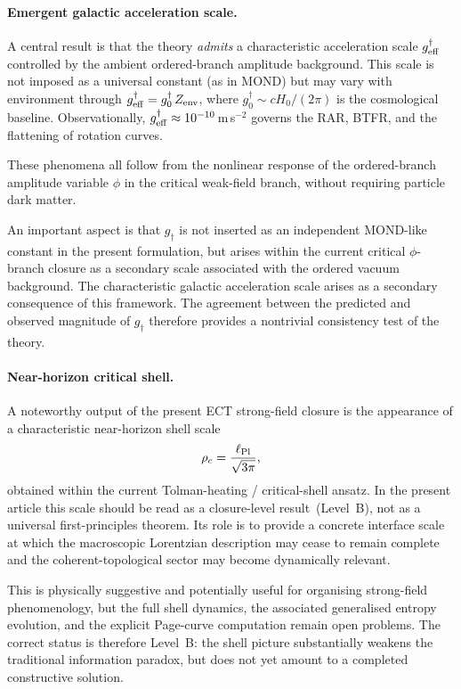 \documentclass[11pt,a4paper]{article}
\numberwithin{equation}{section}
\begin{document}
\paragraph{Emergent galactic acceleration scale.}

A central result is that the theory \emph{admits} a
characteristic acceleration scale $g^\dagger_{\rm eff}$
controlled by the ambient ordered-branch amplitude background.
This scale is not imposed as a universal constant
(as in MOND) but may vary with environment through
$g^\dagger_{\rm eff} = g^\dagger_0\,Z_{\rm env}$,
where $g^\dagger_0 \sim cH_0/(2\pi)$ is the cosmological baseline.
Observationally, $g^\dagger_{\rm eff} \approx 10^{-10}\,$m\,s$^{-2}$
governs the RAR, BTFR, and the flattening of rotation curves.

These phenomena all follow from the nonlinear response of the
ordered-branch amplitude variable $\phi$ in the critical weak-field branch,
without requiring particle dark matter.

An important aspect is that $g_\dagger$ is not inserted as an
independent MOND-like constant in the present formulation, but arises
within the current critical $\phi$-branch closure as a secondary scale
associated with the ordered vacuum background.  The characteristic galactic acceleration
scale arises as a secondary consequence of this framework. The agreement
between the predicted and observed magnitude of $g_\dagger$ therefore
provides a nontrivial consistency test of the theory.


\paragraph{Near-horizon critical shell.}

A noteworthy output of the present ECT strong-field closure is the
appearance of a characteristic near-horizon shell scale
\begin{equation}
  \rho_c = \frac{\ell_{\rm Pl}}{\sqrt{3\pi}},
  \label{eq:rho_c_conclusion}
\end{equation}
obtained within the current Tolman-heating / critical-shell ansatz.
In the present article this scale should be read as a
closure-level result~(Level~B), not as a universal first-principles theorem.
Its role is to provide a concrete interface scale at which the
macroscopic Lorentzian description may cease to remain complete and the
coherent-topological sector may become dynamically relevant.

This is physically suggestive and potentially useful for organising
strong-field phenomenology, but the full shell dynamics, the associated
generalised entropy evolution, and the explicit Page-curve computation
remain open problems.
The correct status is therefore Level~B:
the shell picture substantially weakens the traditional information
paradox, but does not yet amount to a completed constructive solution.
\end{document}
